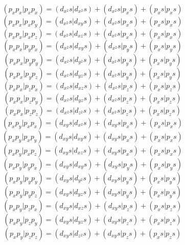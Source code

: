 \documentclass{article}
\begin{document}
\[  ( p_ { x } p_ { x } | p_ { x } p_ { x } ) = ( d_ { x^2 } s | d_ { x^2 } s ) + ( d_ { x^2 } s | p_ { x } s ) + ( p_ { x } s | p_ { x } s )  \]
\[  ( p_ { x } p_ { x } | p_ { x } p_ { y } ) = ( d_ { x^2 } s | d_ { x y } s ) + ( d_ { x^2 } s | p_ { x } s ) + ( p_ { x } s | p_ { x } s )  \]
\[  ( p_ { x } p_ { x } | p_ { x } p_ { z } ) = ( d_ { x^2 } s | d_ { x z } s ) + ( d_ { x^2 } s | p_ { x } s ) + ( p_ { x } s | p_ { x } s )  \]
\[  ( p_ { x } p_ { x } | p_ { y } p_ { x } ) = ( d_ { x^2 } s | d_ { x y } s ) + ( d_ { x^2 } s | p_ { y } s ) + ( p_ { x } s | p_ { y } s )  \]
\[  ( p_ { x } p_ { x } | p_ { y } p_ { y } ) = ( d_ { x^2 } s | d_ { y^2 } s ) + ( d_ { x^2 } s | p_ { y } s ) + ( p_ { x } s | p_ { y } s )  \]
\[  ( p_ { x } p_ { x } | p_ { y } p_ { z } ) = ( d_ { x^2 } s | d_ { y z } s ) + ( d_ { x^2 } s | p_ { y } s ) + ( p_ { x } s | p_ { y } s )  \]
\[  ( p_ { x } p_ { x } | p_ { z } p_ { x } ) = ( d_ { x^2 } s | d_ { x z } s ) + ( d_ { x^2 } s | p_ { z } s ) + ( p_ { x } s | p_ { z } s )  \]
\[  ( p_ { x } p_ { x } | p_ { z } p_ { y } ) = ( d_ { x^2 } s | d_ { y z } s ) + ( d_ { x^2 } s | p_ { z } s ) + ( p_ { x } s | p_ { z } s )  \]
\[  ( p_ { x } p_ { x } | p_ { z } p_ { z } ) = ( d_ { x^2 } s | d_ { z^2 } s ) + ( d_ { x^2 } s | p_ { z } s ) + ( p_ { x } s | p_ { z } s )  \]
\[  ( p_ { x } p_ { y } | p_ { x } p_ { x } ) = ( d_ { x y } s | d_ { x^2 } s ) + ( d_ { x y } s | p_ { x } s ) + ( p_ { x } s | p_ { x } s )  \]
\[  ( p_ { x } p_ { y } | p_ { x } p_ { y } ) = ( d_ { x y } s | d_ { x y } s ) + ( d_ { x y } s | p_ { x } s ) + ( p_ { x } s | p_ { x } s )  \]
\[  ( p_ { x } p_ { y } | p_ { x } p_ { z } ) = ( d_ { x y } s | d_ { x z } s ) + ( d_ { x y } s | p_ { x } s ) + ( p_ { x } s | p_ { x } s )  \]
\[  ( p_ { x } p_ { y } | p_ { y } p_ { x } ) = ( d_ { x y } s | d_ { x y } s ) + ( d_ { x y } s | p_ { y } s ) + ( p_ { x } s | p_ { y } s )  \]
\[  ( p_ { x } p_ { y } | p_ { y } p_ { y } ) = ( d_ { x y } s | d_ { y^2 } s ) + ( d_ { x y } s | p_ { y } s ) + ( p_ { x } s | p_ { y } s )  \]
\[  ( p_ { x } p_ { y } | p_ { y } p_ { z } ) = ( d_ { x y } s | d_ { y z } s ) + ( d_ { x y } s | p_ { y } s ) + ( p_ { x } s | p_ { y } s )  \]
\[  ( p_ { x } p_ { y } | p_ { z } p_ { x } ) = ( d_ { x y } s | d_ { x z } s ) + ( d_ { x y } s | p_ { z } s ) + ( p_ { x } s | p_ { z } s )  \]
\[  ( p_ { x } p_ { y } | p_ { z } p_ { y } ) = ( d_ { x y } s | d_ { y z } s ) + ( d_ { x y } s | p_ { z } s ) + ( p_ { x } s | p_ { z } s )  \]
\[  ( p_ { x } p_ { y } | p_ { z } p_ { z } ) = ( d_ { x y } s | d_ { z^2 } s ) + ( d_ { x y } s | p_ { z } s ) + ( p_ { x } s | p_ { z } s )  \]
\end{document}
